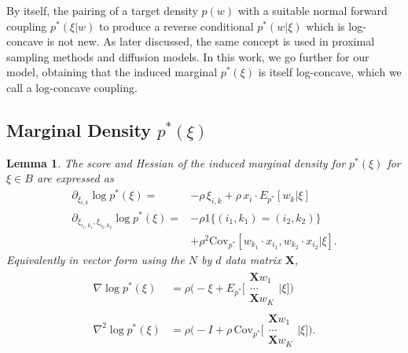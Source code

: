 \documentclass{article}
\numberwithin{equation}{section}
\theoremstyle{Lemma}
\newtheorem{lemma}{Lemma}
\theoremstyle{Corollary}
\theoremstyle{Theorem}
\theoremstyle{Remark}
\begin{document}
By itself, the pairing of a target density $p(w)$ with a suitable normal forward coupling $p^{*}(\xi|w)$ to produce a reverse conditional $p^{*}(w|\xi)$ which is log-concave is not new. As later discussed, the same concept is used in proximal sampling methods and diffusion models. In this work, we go further for our model, obtaining that the induced marginal $p^{*}(\xi)$ is itself log-concave, which we call a log-concave coupling.

\subsection{Marginal Density $p^{*}(\xi)$}

\begin{lemma}
    The score and Hessian of the induced marginal density for $p^{*}(\xi)$ for $\xi \in B$ are expressed as
    \begin{align}
        \partial_{\xi_{i,k}}\log p^{*}(\xi)=&-\rho\,\xi_{i,k}+\rho\,x_{i} \cdot E_{p^{*}}[w_{k}|\xi]\label{score_univariate}\\
        \partial_{ \xi_{i_{1}, k_{1}}, \xi_{i_{2}, k_{2}}} \log p^{*}(\xi)=& -\rho 1\{(i_{1}, k_{1}) = (i_{2}, k_{2})\}\\
        &+\rho^{2}\text{Cov}_{p^{*}}[w_{k_{1}} \cdot x_{i_{1}}, w_{k_{2}} \cdot x_{i_{2}}|\xi].
    \end{align}
    Equivalently in vector form using the $N$ by $d$ data matrix $\textbf{X}$,
    \begin{align}
        \nabla \log p^{*}(\xi)&= \rho\Big( -\xi + E_{p^{*}}\Big[\substack{
            \textbf{X} w_{1}\\
            \ldots\\
            \textbf{X} w_{K}
        }|\xi \Big]\Big) \label{score_exp}\\
    \nabla^{2} \log p^{*}(\xi)&= \rho\Big( -I+\rho\,\text{Cov}_{p^{*}}\Big[\substack{
            \textbf{X} w_{1}\\
            \ldots\\
            \textbf{X} w_{K}
        }|\xi \Big]\Big) \label{hess_exp}.
        \end{align}
\end{lemma}
\end{document}
